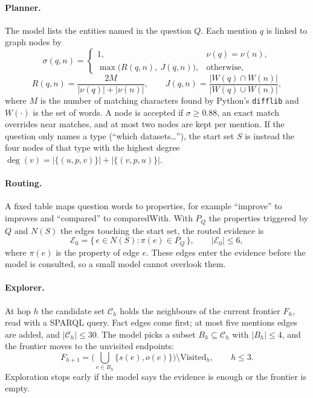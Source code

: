 \documentclass[11pt]{article}
\newcommand{\code}[1]{\texttt{#1}}
\newcommand{\prop}[1]{\textsf{#1}}
\begin{document}
\paragraph{Planner.} The model lists the entities named in the question $Q$. Each mention $q$ is linked to graph nodes by
\begin{equation}
  \sigma(q,n) = \begin{cases} 1, & \nu(q)=\nu(n),\\ \max\big(R(q,n),\ J(q,n)\big), & \text{otherwise,}\end{cases}
\end{equation}
\begin{equation}
  R(q,n) = \frac{2M}{|\nu(q)|+|\nu(n)|},\qquad
  J(q,n) = \frac{|W(q)\cap W(n)|}{|W(q)\cup W(n)|},
\end{equation}
where $M$ is the number of matching characters found by Python's \code{difflib} and $W(\cdot)$ is the set of words. A node is accepted if $\sigma \ge 0.88$, an exact match overrides near matches, and at most two nodes are kept per mention. If the question only names a type (``which datasets\ldots''), the start set $S$ is instead the four nodes of that type with the highest degree $\deg(v)=|\{(u,p,v)\}|+|\{(v,p,u)\}|$.

\paragraph{Routing.} A fixed table maps question words to properties, for example ``improve'' to \prop{improves} and ``compared'' to \prop{comparedWith}. With $P_Q$ the properties triggered by $Q$ and $N(S)$ the edges touching the start set, the routed evidence is
\begin{equation}
  \mathcal{E}_0 = \{\, e \in N(S) : \pi(e) \in P_Q \,\},\qquad |\mathcal{E}_0| \le 6 ,
\end{equation}
where $\pi(e)$ is the property of edge $e$. These edges enter the evidence before the model is consulted, so a small model cannot overlook them.

\paragraph{Explorer.} At hop $h$ the candidate set $\mathcal{C}_h$ holds the neighbours of the current frontier $F_h$, read with a SPARQL query. Fact edges come first; at most five \prop{mentions} edges are added, and $|\mathcal{C}_h| \le 30$. The model picks a subset $B_h \subseteq \mathcal{C}_h$ with $|B_h|\le 4$, and the frontier moves to the unvisited endpoints:
\begin{equation}
  F_{h+1} = \Big(\bigcup_{e\in B_h} \{s(e), o(e)\}\Big) \setminus \mathrm{Visited}_h,\qquad h \le 3 .
\end{equation}
Exploration stops early if the model says the evidence is enough or the frontier is empty.
\end{document}
